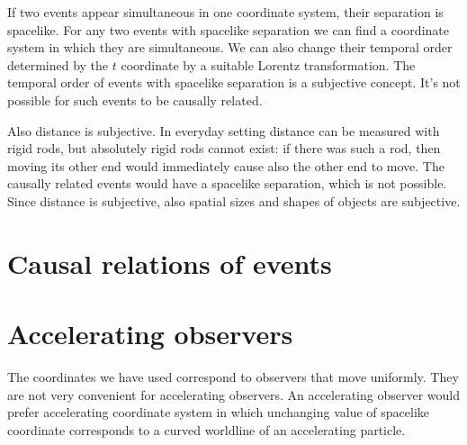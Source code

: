 \documentclass[11pt,oneside%
]{memoir}
\newcommand{\dd}{\mathrm{d}}
\begin{document}
If two events appear simultaneous in one coordinate system, their separation is spacelike. For any two events with spacelike separation we can find a coordinate system in which they are simultaneous. We can also change their temporal order determined by the \(t\) coordinate by a suitable Lorentz transformation. The temporal order of events with spacelike separation is a subjective concept. It's not possible for such events to be causally related.

Also distance is subjective. In everyday setting distance can be measured with rigid rods, but absolutely rigid rods cannot exist: if there was such a rod, then moving its other end would immediately cause also the other end to move. The causally related events would have a spacelike separation, which is not possible. Since distance is subjective, also spatial sizes and shapes of objects are subjective.

\section{Causal relations of events}


%
%
%
%
%
%
%
%
%
%
%
%
%
%
%
%


\section{Accelerating observers}

The coordinates we have used correspond to observers that move uniformly. They are not very convenient for accelerating observers. An accelerating observer would prefer accelerating coordinate system in which unchanging value of spacelike coordinate corresponds to a curved worldline of an accelerating particle.
\end{document}
